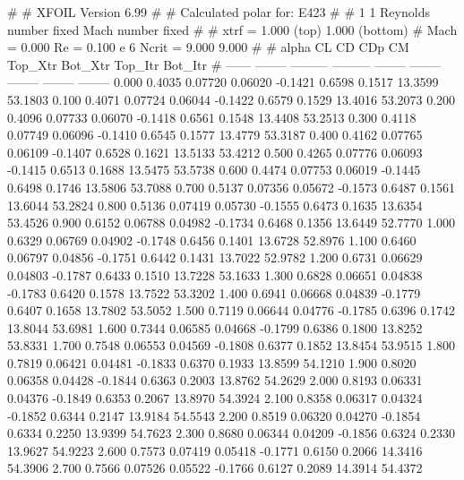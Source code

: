 #  
#       XFOIL         Version 6.99
#  
# Calculated polar for: E423                                            
#  
# 1 1 Reynolds number fixed          Mach number fixed         
#  
# xtrf =   1.000 (top)        1.000 (bottom)  
# Mach =   0.000     Re =     0.100 e 6     Ncrit =   9.000  9.000
#  
#   alpha    CL        CD       CDp       CM     Top_Xtr  Bot_Xtr  Top_Itr  Bot_Itr
#  ------ -------- --------- --------- -------- -------- -------- -------- --------
   0.000   0.4035   0.07720   0.06020  -0.1421   0.6598   0.1517  13.3599  53.1803
   0.100   0.4071   0.07724   0.06044  -0.1422   0.6579   0.1529  13.4016  53.2073
   0.200   0.4096   0.07733   0.06070  -0.1418   0.6561   0.1548  13.4408  53.2513
   0.300   0.4118   0.07749   0.06096  -0.1410   0.6545   0.1577  13.4779  53.3187
   0.400   0.4162   0.07765   0.06109  -0.1407   0.6528   0.1621  13.5133  53.4212
   0.500   0.4265   0.07776   0.06093  -0.1415   0.6513   0.1688  13.5475  53.5738
   0.600   0.4474   0.07753   0.06019  -0.1445   0.6498   0.1746  13.5806  53.7088
   0.700   0.5137   0.07356   0.05672  -0.1573   0.6487   0.1561  13.6044  53.2824
   0.800   0.5136   0.07419   0.05730  -0.1555   0.6473   0.1635  13.6354  53.4526
   0.900   0.6152   0.06788   0.04982  -0.1734   0.6468   0.1356  13.6449  52.7770
   1.000   0.6329   0.06769   0.04902  -0.1748   0.6456   0.1401  13.6728  52.8976
   1.100   0.6460   0.06797   0.04856  -0.1751   0.6442   0.1431  13.7022  52.9782
   1.200   0.6731   0.06629   0.04803  -0.1787   0.6433   0.1510  13.7228  53.1633
   1.300   0.6828   0.06651   0.04838  -0.1783   0.6420   0.1578  13.7522  53.3202
   1.400   0.6941   0.06668   0.04839  -0.1779   0.6407   0.1658  13.7802  53.5052
   1.500   0.7119   0.06644   0.04776  -0.1785   0.6396   0.1742  13.8044  53.6981
   1.600   0.7344   0.06585   0.04668  -0.1799   0.6386   0.1800  13.8252  53.8331
   1.700   0.7548   0.06553   0.04569  -0.1808   0.6377   0.1852  13.8454  53.9515
   1.800   0.7819   0.06421   0.04481  -0.1833   0.6370   0.1933  13.8599  54.1210
   1.900   0.8020   0.06358   0.04428  -0.1844   0.6363   0.2003  13.8762  54.2629
   2.000   0.8193   0.06331   0.04376  -0.1849   0.6353   0.2067  13.8970  54.3924
   2.100   0.8358   0.06317   0.04324  -0.1852   0.6344   0.2147  13.9184  54.5543
   2.200   0.8519   0.06320   0.04270  -0.1854   0.6334   0.2250  13.9399  54.7623
   2.300   0.8680   0.06344   0.04209  -0.1856   0.6324   0.2330  13.9627  54.9223
   2.600   0.7573   0.07419   0.05418  -0.1771   0.6150   0.2066  14.3416  54.3906
   2.700   0.7566   0.07526   0.05522  -0.1766   0.6127   0.2089  14.3914  54.4372
